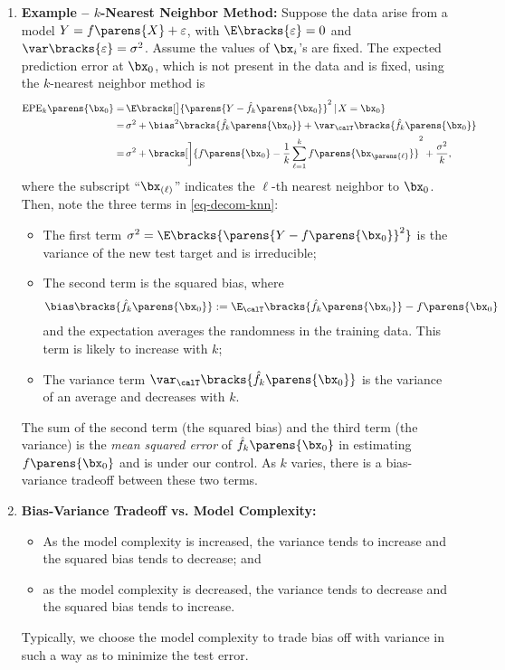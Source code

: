 \documentclass[12pt]{article}
\begin{document}
\begin{enumerate}[label=\textbf{\arabic*.}]
	
	\item \textbf{Example -- $k$-Nearest Neighbor Method:} Suppose the data arise from a model $Y = f \parens{X} + \varepsilon$, with $\E \bracks{\varepsilon} = 0$ and $\var \bracks{\varepsilon} = \sigma^2$. Assume the values of $\bx_i$'s are fixed. The expected prediction error at $\bx_0$, which is not present in the data and is fixed, using the $k$-nearest neighbor method is 
	\begin{align}
		\mathrm{EPE}_k \parens{\bx_0} = & \, \E \bracks[\big]{\parens{Y - \hat{f}_k \parens{\bx_0} }^2 \,\vert\, X = \bx_0} \nonumber \\ 
		= & \, \sigma^2 + \bias^2 \bracks{\hat{f}_k \parens{\bx_0}} + \var_{\calT} \bracks{\hat{f}_k \parens{\bx_0} } \nonumber \\ 
		= & \, \sigma^2 + \bracks[\bigg]{f \parens{\bx_0} - \frac{1}{k} \sum_{\ell=1}^k f \parens{ \bx_{ \parens{\ell}} } }^2 + \frac{\sigma^2}{k}, \label{eq-decom-knn}
	\end{align}
	where the subscript ``$\bx_{(\ell)}$'' indicates the $\ell$-th nearest neighbor to $\bx_0$. Then, note the three terms in \eqref{eq-decom-knn}: 
	\begin{itemize}
		\item The first term $\sigma^2 = \E \bracks{\parens{Y - f \parens{\bx_0}}^2}$ is the variance of the new test target and is irreducible; 
		\item The second term is the squared bias, where 
		\begin{align}
			\bias \bracks{\hat{f}_k \parens{\bx_0}} := \E_{\calT} \bracks{\hat{f}_k \parens{\bx_0}} - f \parens{\bx_0}
		\end{align}
		and the expectation averages the randomness in the training data. This term is likely to increase with $k$; 
		\item The variance term $\var_{\calT} \bracks{\hat{f}_k \parens{\bx_0}}$ is the variance of an average and decreases with $k$. 
	\end{itemize}
	The sum of the second term (the squared bias) and the third term (the variance) is the \textit{mean squared error} of $\hat{f}_k \parens{\bx_0}$ in estimating $f \parens{\bx_0}$ and is under our control. As $k$ varies, there is a bias-variance tradeoff between these two terms. 
	
	\item \textbf{Bias-Variance Tradeoff vs. Model Complexity:} 
	\begin{itemize}
		\item As the model complexity is increased, the variance tends to increase and the squared bias tends to decrease; and 
		\item as the model complexity is decreased, the variance tends to decrease and the squared bias tends to increase. 
	\end{itemize}
	Typically, we choose the model complexity to trade bias off with variance in such a way as to minimize the test error. 

\end{enumerate}

\printbibliography
\end{document}
